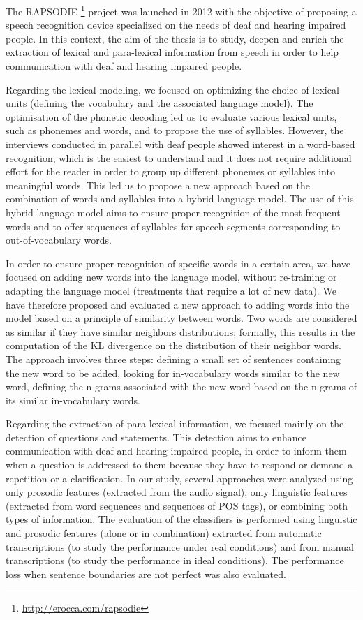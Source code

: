 \documentclass{style/these}
\newcommand\fnurl[2]{%
  \href{#2}{#1}\footnote{\url{#2}}%
}
\begin{document}
{
The RAPSODIE \fnurl{}{http://erocca.com/rapsodie} project was launched in 2012 with the objective of proposing a speech recognition device specialized on the needs of deaf and hearing impaired people. 
In this context, the aim of the thesis is to study, deepen and enrich the extraction of lexical and para-lexical information from speech in order to help communication with deaf and hearing impaired people.

Regarding the lexical modeling, we focused on optimizing the choice of lexical units (defining the vocabulary and the associated language model). 
The optimisation of the phonetic decoding led us to evaluate various lexical units, such as phonemes and words, and to propose the use of syllables. 
However, the interviews conducted in parallel with deaf people showed interest in a word-based recognition, which is the easiest to understand and it does not require additional effort for the reader in order to group up different phonemes or syllables into meaningful words. 
This led us to propose a new approach based on the combination of words and syllables into a hybrid language model. 
The use of this hybrid language model aims to ensure proper recognition of the most frequent words and to offer sequences of syllables for speech segments corresponding to out-of-vocabulary words.
 
In order to ensure proper recognition of specific words in a certain area, we have focused on adding new words into the language model, without re-training or adapting the language model (treatments that require a lot of new data). 
We have therefore proposed and evaluated a new approach to adding words into the model based on a principle of similarity between words. 
Two words are considered as similar if they have similar neighbors distributions; formally, this results in the computation of the KL divergence on the distribution of their neighbor words. 
The approach involves three steps: defining a small set of sentences containing the new word to be added, looking for in-vocabulary words similar to the new word, defining the n-grams associated with the new word based on the n-grams of its similar in-vocabulary words.

Regarding the extraction of para-lexical information, we focused mainly on the detection of questions and statements. 
This detection aims to enhance communication with deaf and hearing impaired people, in order to inform them when a question is addressed to them because they have to respond or demand a repetition or a clarification. 
In our study, several approaches were analyzed using only prosodic features (extracted from the audio signal), only linguistic features (extracted from word sequences and sequences of POS tags), or combining both types of information. 
The evaluation of the classifiers is performed using linguistic and prosodic features (alone or in combination) extracted from automatic transcriptions (to study the performance under real conditions) and from manual transcriptions (to study the performance in ideal conditions). 
The performance loss when sentence boundaries are not perfect was also evaluated.


}
\end{document}
